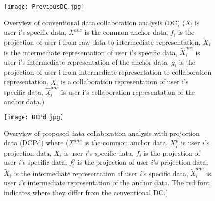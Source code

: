\documentclass{article}
\begin{document}


\begin{figure}[h]
    \centering
    \texttt{[image: PreviousDC.jpg]}
  \caption{Overview of conventional data collaboration analysis (DC) ($X_{i}$ is user i's specific data, $X^{anc}$ is the common anchor data, $f_{i}$ is the projection of user i from raw data to intermediate representation, $\tilde{X}_{i}$ is the intermediate representation of user i's specific data, $\tilde{X}^{anc}_{i}$ is user i's intermediate representation of the anchor data, $g_{i}$ is the projection of user i from intermediate representation to collaboration representation, $\tilde{X}_{i}$ is a collaboration representation of user i's specific data, $\hat{X}^{anc}_{i}$ is user i's collaboration representation of the anchor data.)}\label{PreviousDC}
\end{figure}

 \begin{figure}[h]
    \centering
    \texttt{[image: DCPd.jpg]}
  \caption{Overview of proposed data collaboration analysis with projection data (DCPd) where ($X^{anc}$ is the common anchor data, $X^{p}_{i}$ is user $i$'s projection data, $X_{i}$ is user $i$'s specific data, $f_{i}$ is the projection of user $i$'s specific data, $f^{p}_{i}$ is the projection of user $i$'s projection data, $\tilde{X}_{i}$ is the intermediate representation of user $i$'s specific data, $\tilde{X}^{anc}_{i}$ is user $i$'s intermediate representation of the anchor data. The red font indicates where they differ from the conventional DC.)}\label{DCPd}
\end{figure}

\renewcommand{\algorithmicrequire}{\textbf{Input:}}
\renewcommand{\algorithmicensure}{\textbf{Output:}}
\end{document}
